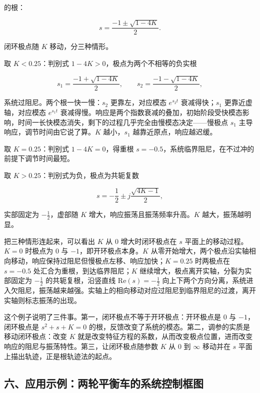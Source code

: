 \documentclass[12pt]{ctexart}
\begin{document}
的根：

\[
s=\frac{-1\pm\sqrt{1-4K}}{2}.
\]

闭环极点随 \(K\) 移动，分三种情形。

取 \(K<0.25\)：判别式 \(1-4K>0\)，极点为两个不相等的负实根

\[
s_1=\frac{-1+\sqrt{1-4K}}{2},\qquad s_2=\frac{-1-\sqrt{1-4K}}{2},
\]

系统过阻尼。两个根一快一慢：\(s_2\) 更靠左，对应模态 \(e^{s_2 t}\)
衰减得快；\(s_1\) 更靠近虚轴，对应模态 \(e^{s_1 t}\)
衰减得慢。响应是两个指数衰减的叠加，初始阶段受快模态影响，时间一长快模态消失，剩下的过程几乎完全由慢模态决定------慢极点
\(s_1\) 主导响应，调节时间由它说了算。\(K\) 越小，\(s_1\)
越靠近原点，响应越迟缓。

取 \(K=0.25\)：判别式 \(1-4K=0\)，得重根
\(s=-0.5\)，系统临界阻尼，在不过冲的前提下调节时间最短。

取 \(K>0.25\)：判别式为负，极点为共轭复数

\[
s=-\frac{1}{2}\pm j\frac{\sqrt{4K-1}}{2},
\]

实部固定为 \(-\frac{1}{2}\)，虚部随 \(K\)
增大，响应振荡且振荡频率升高。\(K\) 越大，振荡越明显。

把三种情形连起来，可以看出 \(K\) 从 \(0\) 增大时闭环极点在 \(s\)
平面上的移动过程。\(K=0\) 时极点为 \(0\) 与
\(-1\)，即开环极点本身。\(K\)
从零开始增大，两个极点沿实轴相向移动，响应保持过阻尼但慢极点左移、响应加快；\(K=0.25\)
时两极点在 \(s=-0.5\) 处汇合为重根，到达临界阻尼；\(K\)
继续增大，极点离开实轴，分裂为实部固定为 \(-\frac{1}{2}\)
的共轭复根，沿竖直线 \(\mathrm{Re}(s)=-\frac{1}{2}\)
向上下两个方向分离，系统进入欠阻尼，振荡越来越强。实轴上的相向移动对应过阻尼到临界阻尼的过渡，离开实轴则标志振荡的出现。

这个例子说明了三件事。第一，闭环极点不等于开环极点：开环极点是 \(0\) 与
\(-1\)，闭环极点是 \(s^2+s+K=0\)
的根，反馈改变了系统的模态。第二，调参的实质是移动闭环极点：改变 \(K\)
就是改变特征方程的系数，从而改变极点位置，进而改变响应的阻尼与振荡特性。第三，让闭环极点随参数
\(K\) 从 \(0\) 到 \(\infty\) 移动并在 \(s\)
平面上描出轨迹，正是根轨迹法的起点。

\hypertarget{ux516dux5e94ux7528ux793aux4f8bux4e24ux8f6eux5e73ux8861ux8f66ux7684ux7cfbux7edfux63a7ux5236ux6846ux56fe}{%
\subsection{六、应用示例：两轮平衡车的系统控制框图}\label{ux516dux5e94ux7528ux793aux4f8bux4e24ux8f6eux5e73ux8861ux8f66ux7684ux7cfbux7edfux63a7ux5236ux6846ux56fe}}
\end{document}
